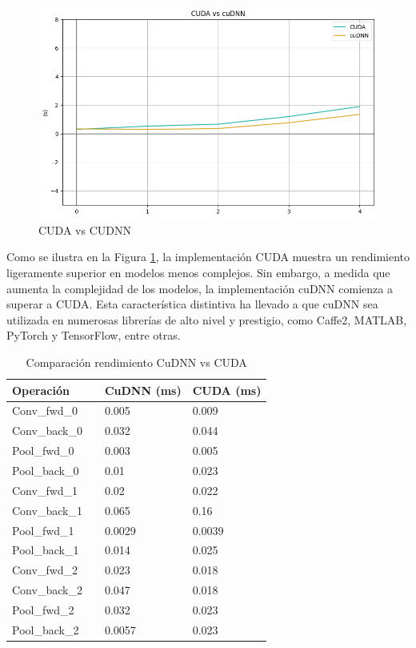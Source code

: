 \begin{figure}[H]
	\centering
	\includegraphics[scale=0.52]{imagenes/cuda_cudnn_1.png}  
	\caption{CUDA vs CUDNN}
	\label{fig:cuda_cudnn_1}
\end{figure}

Como se ilustra en la Figura \ref{fig:cuda_cudnn_1}, la implementación CUDA muestra un rendimiento ligeramente superior en modelos menos complejos. Sin embargo, a medida que aumenta la complejidad de los modelos, la implementación cuDNN comienza a superar a CUDA. Esta característica distintiva ha llevado a que cuDNN sea utilizada en numerosas librerías de alto nivel y prestigio, como Caffe2, MATLAB, PyTorch y TensorFlow, entre otras. 

\begin{table}[H]
	\centering
	\begin{tabular}{llll}
		Operación 	 &\vline  & CuDNN (ms) & CUDA (ms)  \\
		\hline
		
		Conv\_fwd\_0    & \vline & 0.005	 &	0.009 \\			
		Conv\_back\_0   & \vline & 	0.032 &	0.044 \\
		\hline
		Pool\_fwd\_0 	 & \vline & 0.003	 &	0.005 \\
		Pool\_back\_0 	 & \vline & 0.01    &	0.023 \\
		\hline
		\hline
		\hline
		Conv\_fwd\_1    & \vline & 0.02	 &	0.022	\\			
		Conv\_back\_1   & \vline & 0.065	 &	0.16	\\
		\hline
		Pool\_fwd\_1 	 & \vline & 0.0029	 &	0.0039	 \\
		Pool\_back\_1 	 & \vline  & 0.014    &	0.025	 \\
		\hline
		\hline
		\hline
		Conv\_fwd\_2    & \vline & 0.023	 &	0.018 \\			
		Conv\_back\_2   & \vline & 0.047	 &	0.018 \\
		\hline
		Pool\_fwd\_2 	 & \vline & 0.032	 &	0.023 \\
		Pool\_back\_2 	 & \vline & 0.0057    &	0.023 \\	
	\end{tabular}
	\caption{Comparación rendimiento CuDNN vs CUDA}
	\label{tabla_resultados}
\end{table}

